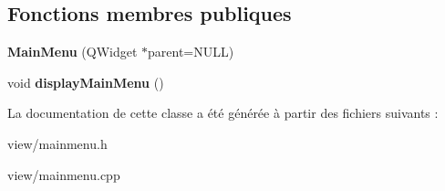 \subsection*{Fonctions membres publiques}
\begin{DoxyCompactItemize}
\item 
\hypertarget{classMainMenu_a15507d68640fd9651dae4a6e3cf9b870}{{\bfseries Main\+Menu} (Q\+Widget $\ast$parent=N\+U\+L\+L)}\label{classMainMenu_a15507d68640fd9651dae4a6e3cf9b870}

\item 
\hypertarget{classMainMenu_a4b83847fe6109626f6dd4404c8afe4b2}{void {\bfseries display\+Main\+Menu} ()}\label{classMainMenu_a4b83847fe6109626f6dd4404c8afe4b2}

\end{DoxyCompactItemize}


La documentation de cette classe a été générée à partir des fichiers suivants \+:\begin{DoxyCompactItemize}
\item 
view/mainmenu.\+h\item 
view/mainmenu.\+cpp\end{DoxyCompactItemize}
